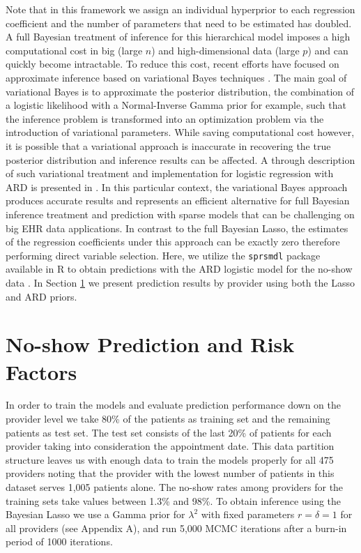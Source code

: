 \documentclass[twoside,11pt]{article}
\begin{document}
Note that in this framework we assign an individual hyperprior to each regression coefficient and the number of parameters that need to be estimated has doubled. A full Bayesian treatment of inference for this hierarchical model imposes a high computational cost in big (large $n$) and high-dimensional data (large $p$) and can quickly become intractable. To reduce this cost, recent efforts have focused on approximate inference based on variational Bayes techniques \citep{JaakkolaJordan00, Bishop06}. The main goal of variational Bayes is to approximate the posterior distribution, the combination of a logistic likelihood with a Normal-Inverse Gamma prior for example, such that the inference problem is transformed into an optimization problem via the introduction of variational parameters. While saving computational cost however, it is possible that a variational approach is inaccurate in recovering the true posterior distribution and inference results can be affected. A through description of such variational treatment and implementation for logistic regression with ARD is presented in \cite{Drugowitsch17}. In this particular context, the variational Bayes approach produces accurate results and represents an efficient alternative for full Bayesian inference treatment and prediction with sparse models that can be challenging on big EHR data applications. In contrast to the full Bayesian Lasso, the estimates of the regression coefficients under this approach can be exactly zero therefore performing direct variable selection. Here, we utilize the \texttt{sprsmdl} package available in R to obtain predictions with the ARD logistic model for the no-show data \citep{Saito15}. In Section \ref{sec:application} we present prediction results by provider using both the Lasso and ARD priors.

\section{No-show Prediction and Risk Factors} \label{sec:application}

In order to train the models and evaluate prediction performance down on the provider level we take 80\% of the patients as training set and the remaining patients as test set. The test set consists of the last 20\% of patients for each provider taking into consideration the appointment date. This data partition structure leaves us with enough data to train the models properly for all 475 providers noting that the provider with the lowest number of patients in this dataset serves 1,005 patients alone. The no-show rates among providers for the training sets take values between 1.3\% and 98\%. To obtain inference using the Bayesian Lasso we use a Gamma prior for $\lambda^2$ with fixed parameters $r=\delta=1$ for all providers (see Appendix A), and run 5,000 MCMC iterations after a burn-in period of 1000 
iterations.
\end{document}
